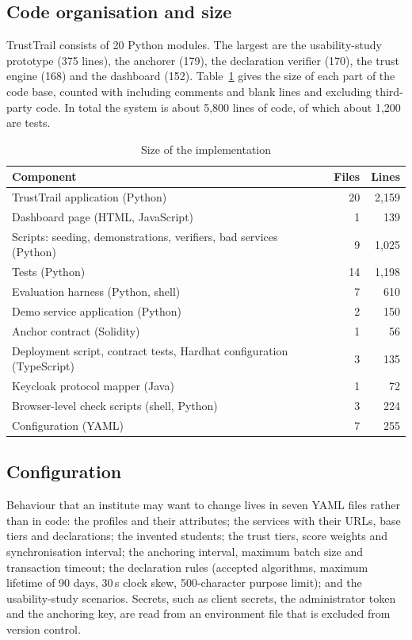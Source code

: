 \subsection{Code organisation and size}
TrustTrail consists of 20 Python modules. The largest are the usability-study prototype (375 lines), the anchorer (179), the declaration verifier (170), the trust engine (168) and the dashboard (152). Table~\ref{tab:loc} gives the size of each part of the code base, counted with  including comments and blank lines and excluding third-party code. In total the system is about 5{,}800 lines of code, of which about 1{,}200 are tests.

\begin{table}[t]
\centering
\caption{Size of the implementation}
\label{tab:loc}
\small
\begin{tabular}{@{}lrr@{}}
\toprule
Component & Files & Lines \\
\midrule
TrustTrail application (Python) & 20 & 2{,}159 \\
Dashboard page (HTML, JavaScript) & 1 & 139 \\
Scripts: seeding, demonstrations, verifiers, bad services (Python) & 9 & 1{,}025 \\
Tests (Python) & 14 & 1{,}198 \\
Evaluation harness (Python, shell) & 7 & 610 \\
Demo service application (Python) & 2 & 150 \\
Anchor contract (Solidity) & 1 & 56 \\
Deployment script, contract tests, Hardhat configuration (TypeScript) & 3 & 135 \\
Keycloak protocol mapper (Java) & 1 & 72 \\
Browser-level check scripts (shell, Python) & 3 & 224 \\
Configuration (YAML) & 7 & 255 \\
\bottomrule
\end{tabular}
\end{table}

\subsection{Configuration}
Behaviour that an institute may want to change lives in seven YAML files rather than in code: the profiles and their attributes; the services with their URLs, base tiers and declarations; the invented students; the trust tiers, score weights and synchronisation interval; the anchoring interval, maximum batch size and transaction timeout; the declaration rules (accepted algorithms, maximum lifetime of 90 days, 30\,s clock skew, 500-character purpose limit); and the usability-study scenarios. Secrets, such as client secrets, the administrator token and the anchoring key, are read from an environment file that is excluded from version control.

